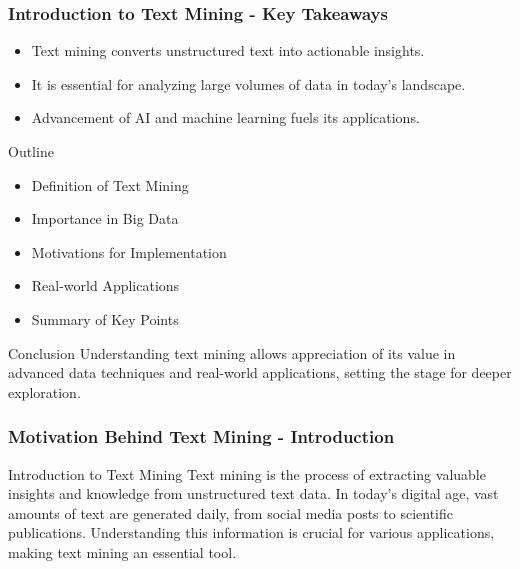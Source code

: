 \documentclass[aspectratio=169]{beamer}
\begin{document}
\begin{frame}[fragile]
    \frametitle{Introduction to Text Mining - Key Takeaways}
    \begin{itemize}
        \item Text mining converts unstructured text into actionable insights.
        \item It is essential for analyzing large volumes of data in today's landscape.
        \item Advancement of AI and machine learning fuels its applications.
    \end{itemize}

    \begin{block}{Outline}
        \begin{itemize}
            \item Definition of Text Mining
            \item Importance in Big Data
            \item Motivations for Implementation
            \item Real-world Applications
            \item Summary of Key Points
        \end{itemize}
    \end{block}

    \begin{block}{Conclusion}
        Understanding text mining allows appreciation of its value in advanced data techniques and real-world applications, setting the stage for deeper exploration.
    \end{block}
\end{frame}

\begin{frame}[fragile]
    \frametitle{Motivation Behind Text Mining - Introduction}
    \begin{block}{Introduction to Text Mining}
        Text mining is the process of extracting valuable insights and knowledge from unstructured text data. 
        In today’s digital age, vast amounts of text are generated daily, from social media posts to scientific publications. 
        Understanding this information is crucial for various applications, making text mining an essential tool.
    \end{block}
\end{frame}
\end{document}
